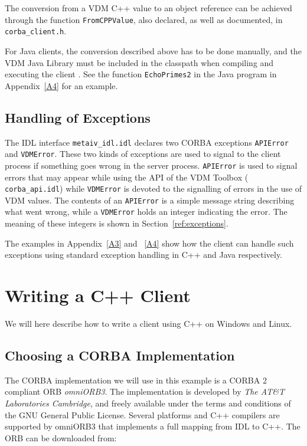 \documentclass[\pformat,12pt]{article}
\begin{document}
The conversion from a VDM C++ value to an object reference can be
achieved through the function {\tt FromCPPValue}, also declared, as
well as documented, in {\tt corba\_client.h}.  

For Java clients, the conversion described above has to be done
manually, and the VDM Java Library must be included in the classpath
when compiling and executing the client \cite{CGJavaManPP-CSK}.
See the function \texttt{EchoPrimes2} in the Java program in
Appendix~\ref{A4} for an example.

\subsection{Handling of Exceptions}
\label{handlingofexceptions}

The IDL interface {\tt metaiv\_idl.idl}  declares two CORBA exceptions
{\tt APIError} and {\tt VDMError}. These two kinds 
of exceptions are used to signal to the client process if something
goes wrong in the server process. {\tt APIError} is used to signal errors
that may appear while using the API of the VDM Toolbox ({\tt
  corba\_api.idl}) while {\tt VDMError} is devoted to the signalling of
errors in the use of VDM values. The contents of an {\tt APIError} is a
simple message string describing what went wrong, while a {\tt VDMError}
holds an integer indicating the error. The meaning of these integers
is shown in Section~\ref{ref:exceptions}.

The examples in Appendix~\ref{A3} and ~\ref{A4} show how
the client can handle such exceptions using standard exception
handling in C++ and Java respectively.

\newpage
\section{Writing a C++ Client}
\label{writingacppclient}

We will here describe  how to write a client using C++ on Windows
and Linux.  

\subsection{Choosing a CORBA Implementation}

The CORBA implementation we will use in this example is a CORBA 2
compliant ORB {\em omniORB3}. The implementation is developed by {\em The
AT\&T Laboratories Cambridge}, and freely available under
the terms and conditions of the GNU General Public License. Several
platforms and C++ compilers are supported by omniORB3 that implements
a full mapping from IDL to C++.  The ORB can be downloaded from:
\end{document}

